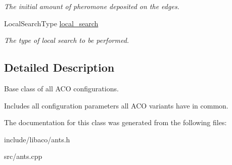 \begin{CompactItemize}
\begin{CompactList}\small\item\em The initial amount of pheromone deposited on the edges. \item\end{CompactList}\item 
\hypertarget{classAntColonyConfiguration_b8eb9dd710a57a0f8c6f40d5ff82dcc0}{
LocalSearchType \hyperlink{classAntColonyConfiguration_b8eb9dd710a57a0f8c6f40d5ff82dcc0}{local\_\-search}}
\label{classAntColonyConfiguration_b8eb9dd710a57a0f8c6f40d5ff82dcc0}

\begin{CompactList}\small\item\em The type of local search to be performed. \item\end{CompactList}\end{CompactItemize}


\subsection{Detailed Description}
Base class of all ACO configurations. 

Includes all configuration parameters all ACO variants have in common. 

The documentation for this class was generated from the following files:\begin{CompactItemize}
\item 
include/libaco/ants.h\item 
src/ants.cpp\end{CompactItemize}
